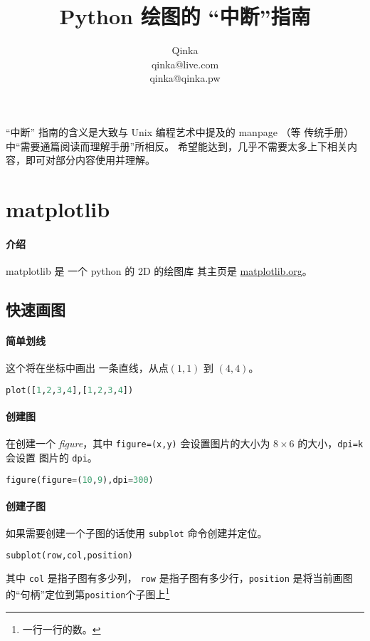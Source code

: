 \documentclass{ctexart}
\author{Qinka \\ qinka@live.com \\ qinka@qinka.pw}
\title{Python 绘图的 “中断”指南}
\begin{document}
%
\maketitle
%
%
{\tiny “中断” 指南的含义是大致与 Unix 编程艺术中提及的 manpage （等 传统手册）中“需要通篇阅读而理解手册”所相反。
  希望能达到，几乎不需要太多上下相关内容，即可对部分内容使用并理解。}
\newpage

\section{matplotlib}

\paragraph{介绍}
matplotlib 是 一个 python 的 2D 的绘图库 其主页是 \href{http://matplotlib.org}{matplotlib.org}。

\subsection{快速画图}

\paragraph{简单划线}
这个将在坐标中画出 一条直线，从点$(1,1)$ 到 $(4,4)$。
\begin{lstlisting}[language=python]
plot([1,2,3,4],[1,2,3,4])
\end{lstlisting}

\paragraph{创建图}
在创建一个 \textit{figure}，其中 \lstinline|figure=(x,y)| 会设置图片的大小为 $8 \times 6$ 的大小，\lstinline|dpi=k| 会设置 图片的 \verb|dpi|。
\begin{lstlisting}[language=python]
figure(figure=(10,9),dpi=300)
\end{lstlisting}

\paragraph{创建子图}
如果需要创建一个子图的话使用 \lstinline|subplot| 命令创建并定位。
\begin{lstlisting}[language=python]
subplot(row,col,position)
\end{lstlisting}
其中 \verb|col| 是指子图有多少列， \verb|row| 是指子图有多少行，\verb|position| 是将当前画图的“句柄”定位到第\verb|position|个子图上\footnote{一行一行的数。}
\end{document}

